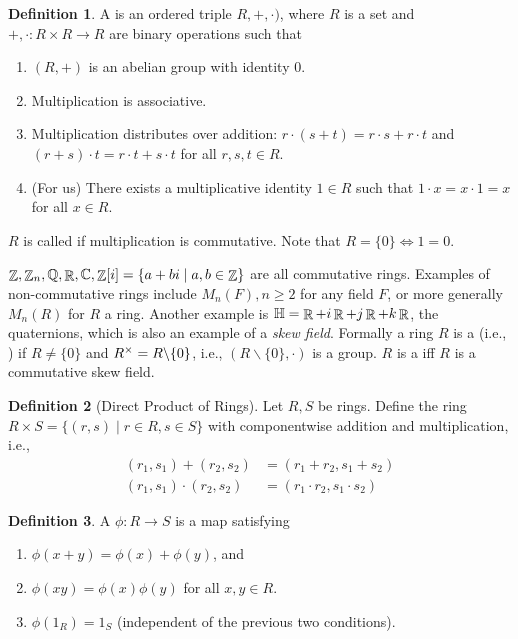 \documentclass[11pt]{book}
\theoremstyle{definition}   \newtheorem{defn}[counter]{Definition} %
\newtheorem*{defn*}{Definition}
\newcommand{\bs}{\backslash}   \newcommand{\A}{\mathcal{A}}   \newcommand{\sy}{\textnormal{Syl}}   \newcommand{\size}[1]{\left| #1 \right|}
\DeclareMathOperator{\R}{\mathbb{R}}   \DeclareMathOperator{\N}{\mathbb{N}}   \DeclareMathOperator{\z}{\mathbb{Z}}   \DeclareMathOperator{\Q}{\mathbb{Q}}
\DeclareMathOperator{\ra}{\rightarrow}   \DeclareMathOperator{\Poly}{\mathbf{P}}   \DeclareMathOperator{\spn}{\textnormal{span}}   \DeclareMathOperator{\aut}{\textnormal{Aut}}
\newcommand{\vs}{\vspace{8pt}}
\numberwithin{counter}{chapter}
\begin{document}
\begin{defn*}
A  is an ordered triple $R,+,\cdot)$, where $R$ is a set and $+,\cdot : R \times R \ra R$ are binary operations such that
\begin{enumerate}
\item[(1)] $(R,+)$ is an abelian group with identity $0$.
\item[(2)] Multiplication is associative.
\item[(3)] Multiplication distributes over addition: $r \cdot (s+t) = r \cdot s + r \cdot t$ and $(r+s) \cdot t = r \cdot t + s \cdot t$ for all $r,s,t \in R$.
\item[(3)] (For us) There exists a multiplicative identity $1 \in R$ such that $1 \cdot x = x \cdot 1 = x$ for all $x \in R$.
\end{enumerate}

$R$ is called  if multiplication is commutative. Note that $R = \{0\} \iff 1 = 0$.

\begin{example*}
$\z, \z_n, \Q, \R, \C, \z[i] = \{a+bi \mid a,b \in \z\}$ are all commutative rings. Examples of non-commutative rings include $M_n(F), n \geq 2$ for any field $F$, or more generally $M_n(R)$ for $R$ a ring. Another example is $\h = \R + i \R + j \R + k \R$, the quaternions, which is also an example of a \emph{skew field}. Formally a ring $R$ is a  (i.e., ) if $R \ne \{0\}$ and $R\x = R \bs \{0\}$, i.e., $(R\bs\{0\},\cdot)$ is a group. $R$ is a  iff $R$ is a commutative skew field.
\end{example*}
\end{defn*}

\vs

\begin{defn*}[Direct Product of Rings]
Let $R,S$ be rings. Define the ring $R \times S = \{(r,s) \mid r \in R, s \in S\}$ with componentwise addition and multiplication, i.e.,
	\begin{align*}
	(r_1,s_1) + (r_2,s_2) &= (r_1 + r_2, s_1 + s_2) \\
	(r_1,s_1) \cdot (r_2,s_2) &= (r_1 \cdot r_2, s_1 \cdot s_2)
	\end{align*}
\end{defn*}

\vs

\begin{defn*}
A  $\phi : R \ra S$ is a map satisfying
\begin{enumerate}
\item[(1)] $\phi(x+y) = \phi(x) + \phi(y)$, and
\item[(2)] $\phi(xy) = \phi(x) \phi(y)$ for all $x,y \in R$.
\item[(3)*] $\phi(1_R) = 1_S$ (independent of the previous two conditions).
\end{enumerate}
\end{defn*}
\end{document}
